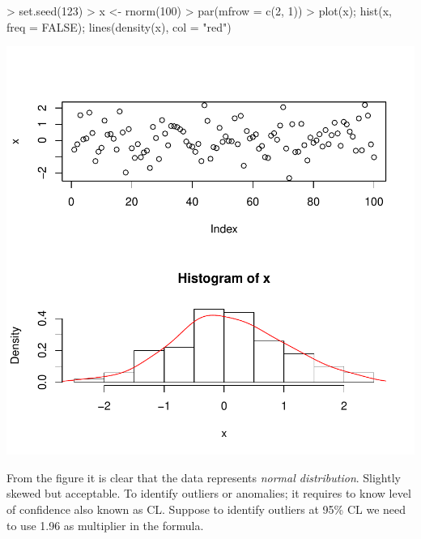\documentclass{article}
\begin{document}
\begin{Schunk}
\begin{Sinput}
> set.seed(123)
> x <- rnorm(100)
> par(mfrow = c(2, 1))
> plot(x); hist(x, freq = FALSE); lines(density(x), col = "red")
\end{Sinput}
\end{Schunk}
\includegraphics{anadetect-001}

From the figure it is clear that the data represents \emph{normal distribution}. Slightly skewed but acceptable. To identify outliers or anomalies; it requires to know level of confidence also known as CL. Suppose to identify outliers at 95\% CL we need to use 1.96 as multiplier in the formula. 
\end{document}
